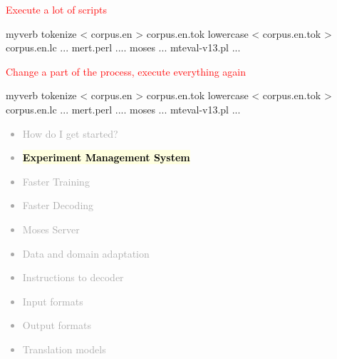 \documentclass[landscape]{uedslides2C}
\newcommand{\currenttopic}[1]{\colorbox{lightyellow}{\textcolor{black}{\bf #1}}}
\begin{document}
{\small

\begin{center}
\textcolor{red}{Execute a lot of scripts} \\
\begin{SaveVerbatim}{myverb}
tokenize < corpus.en > corpus.en.tok
lowercase < corpus.en.tok > corpus.en.lc
...
mert.perl ....
moses ...
mteval-v13.pl ...
\end{SaveVerbatim}
\colorbox{gray}{}

\vspace{10mm}
\textcolor{red}{Change a part of the process, execute everything again} \\
\begin{SaveVerbatim}{myverb}
tokenize < corpus.en > corpus.en.tok
lowercase < corpus.en.tok > corpus.en.lc
...
mert.perl ....
moses ...
mteval-v13.pl ...
\end{SaveVerbatim}
\colorbox{gray}{}
\end{center}
}


% 
% 
% 



\vspace{-5mm}
\textcolor{darkgrey}{
\begin{itemize} \itemsep -1mm
\item {How do I get started?}
\item \currenttopic{Experiment Management System}
\item {Faster Training}
\item {Faster Decoding}
\item {Moses Server}
\item {Data and domain adaptation}
\item {Instructions to decoder}
\item {Input formats}
\item {Output formats}
\item {Translation models}
\end{itemize}
}
\end{document}
